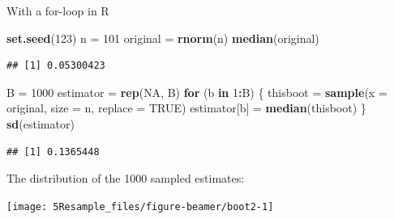\documentclass[10pt,ignorenonframetext,]{beamer}
\newenvironment{Shaded}{\begin{snugshade}}{\end{snugshade}}
\newcommand{\KeywordTok}[1]{\textcolor[rgb]{0.13,0.29,0.53}{\textbf{#1}}}
\newcommand{\DataTypeTok}[1]{\textcolor[rgb]{0.13,0.29,0.53}{#1}}
\newcommand{\DecValTok}[1]{\textcolor[rgb]{0.00,0.00,0.81}{#1}}
\newcommand{\StringTok}[1]{\textcolor[rgb]{0.31,0.60,0.02}{#1}}
\newcommand{\OtherTok}[1]{\textcolor[rgb]{0.56,0.35,0.01}{#1}}
\newcommand{\ControlFlowTok}[1]{\textcolor[rgb]{0.13,0.29,0.53}{\textbf{#1}}}
\newcommand{\OperatorTok}[1]{\textcolor[rgb]{0.81,0.36,0.00}{\textbf{#1}}}
\newcommand{\NormalTok}[1]{#1}
\begin{document}
\begin{frame}[fragile]

\begin{block}{With a for-loop in R}

\begin{Shaded}
\begin{Highlighting}[]
\KeywordTok{set.seed}\NormalTok{(}\DecValTok{123}\NormalTok{)}
\NormalTok{n =}\StringTok{ }\DecValTok{101}
\NormalTok{original =}\StringTok{ }\KeywordTok{rnorm}\NormalTok{(n)}
\KeywordTok{median}\NormalTok{(original)}
\end{Highlighting}
\end{Shaded}

\begin{verbatim}
## [1] 0.05300423
\end{verbatim}

\begin{Shaded}
\begin{Highlighting}[]
\NormalTok{B =}\StringTok{ }\DecValTok{1000}
\NormalTok{estimator =}\StringTok{ }\KeywordTok{rep}\NormalTok{(}\OtherTok{NA}\NormalTok{, B)}
\ControlFlowTok{for}\NormalTok{ (b }\ControlFlowTok{in} \DecValTok{1}\OperatorTok{:}\NormalTok{B) \{}
\NormalTok{    thisboot =}\StringTok{ }\KeywordTok{sample}\NormalTok{(}\DataTypeTok{x =}\NormalTok{ original, }\DataTypeTok{size =}\NormalTok{ n, }\DataTypeTok{replace =} \OtherTok{TRUE}\NormalTok{)}
\NormalTok{    estimator[b] =}\StringTok{ }\KeywordTok{median}\NormalTok{(thisboot)}
\NormalTok{\}}
\KeywordTok{sd}\NormalTok{(estimator)}
\end{Highlighting}
\end{Shaded}

\begin{verbatim}
## [1] 0.1365448
\end{verbatim}

\end{block}

\end{frame}

\begin{frame}

The distribution of the 1000 sampled estimates:

\begin{center}\texttt{[image: 5Resample\_files/figure-beamer/boot2-1]} \end{center}

\end{frame}
\end{document}
